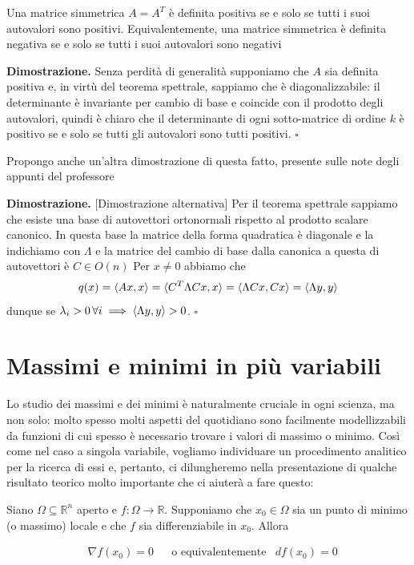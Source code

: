 \vspace{0.5cm}
\begin{cor}
Una matrice simmetrica $A=A^T$ è definita positiva se e solo se tutti i suoi autovalori sono positivi. Equivalentemente, una matrice simmetrica è definita negativa se e solo se tutti i suoi autovalori sono negativi
\end{cor}

\noindent \textbf{Dimostrazione. }
Senza perdità di generalità supponiamo che $A$ sia definita positiva e, in virtù del teorema spettrale, sappiamo che è diagonalizzabile: il determinante è invariante per cambio di base e coincide con il prodotto degli autovalori, quindi è chiaro che il determinante di ogni sotto-matrice di ordine $k$ è positivo se e solo se tutti gli autovalori sono tutti positivi.
\hfill $\square$

Propongo anche un'altra dimostrazione di questa fatto, presente sulle note degli appunti del professore

\noindent \textbf{Dimostrazione. } [Dimostrazione alternativa]
Per il teorema spettrale sappiamo che esiste una base di autovettori ortonormali rispetto al prodotto scalare canonico. In questa base la matrice della forma quadratica è diagonale e la indichiamo con $\Lambda$ e la matrice del cambio di base dalla canonica a questa di autovettori è $C \in O(n)$ Per $x \neq 0$ abbiamo che
$$
q(x) = \langle Ax, x \rangle = \langle C^T \Lambda C x, x \rangle = \langle \Lambda Cx, Cx \rangle = \langle \Lambda y, y \rangle
$$
dunque se $\lambda_i > 0 \, \forall i \implies \langle \Lambda y, y \rangle > 0$.
\hfill $\square$

\vspace{0.5cm}
\section{Massimi e minimi in più variabili}
Lo studio dei massimi e dei minimi è naturalmente cruciale in ogni scienza, ma non solo: molto spesso molti aspetti del quotidiano sono facilmente modellizzabili da funzioni di cui spesso è necessario trovare i valori di massimo o minimo. Così come nel caso a singola variabile, vogliamo individuare un procedimento analitico per la ricerca di essi e, pertanto, ci dilungheremo nella presentazione di qualche risultato teorico molto importante che ci aiuterà a fare questo:

\vspace{0.5cm}
\begin{theorem}[\textcolor{blue}{di Fermat}]
Siano $\Omega \subseteq \mathbb{R}^n$ aperto e $f: \Omega \to \mathbb{R}$. Supponiamo che $x_0 \in \Omega$ sia un punto di minimo (o massimo) locale e che $f$ sia differenziabile in $x_0$. Allora

\[\begin{aligned}
&\nabla{f(x_0)} = 0 & &\text{o equivalentemente} &df(x_0) = 0 
\end{aligned}\]
\end{theorem}

